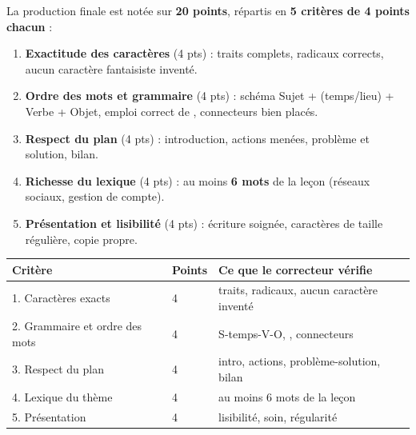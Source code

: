 \documentclass[11pt]{article}
\newcommand{\zh}[1]{\ifmmode\text{#1}\else{#1}\fi}
\begin{document}
\begin{propriete}
La production finale est notée sur \textbf{20 points}, répartis en \textbf{5 critères de 4 points chacun} :
\begin{enumerate}
\item \textbf{Exactitude des caractères} (4 pts) : traits complets, radicaux corrects, aucun caractère fantaisiste inventé.
\item \textbf{Ordre des mots et grammaire} (4 pts) : schéma Sujet + (temps/lieu) + Verbe + Objet, emploi correct de \zh{的}, connecteurs bien placés.
\item \textbf{Respect du plan} (4 pts) : introduction, actions menées, problème et solution, bilan.
\item \textbf{Richesse du lexique} (4 pts) : au moins \textbf{6 mots} de la leçon (réseaux sociaux, gestion de compte).
\item \textbf{Présentation et lisibilité} (4 pts) : écriture soignée, caractères de taille régulière, copie propre.
\end{enumerate}
\end{propriete}

\begin{center}
\begin{tabularx}{\linewidth}{|X|X|X|}\hline
\rowcolor{popblueL} Critère & Points & Ce que le correcteur vérifie \\ \hline
1. Caractères exacts & 4 & traits, radicaux, aucun caractère inventé \\ \hline
2. Grammaire et ordre des mots & 4 & S-temps-V-O, \zh{的}, connecteurs \\ \hline
3. Respect du plan & 4 & intro, actions, problème-solution, bilan \\ \hline
4. Lexique du thème & 4 & au moins 6 mots de la leçon \\ \hline
5. Présentation & 4 & lisibilité, soin, régularité \\ \hline
\end{tabularx}
\end{center}
\end{document}
